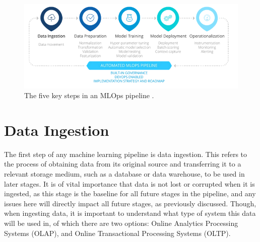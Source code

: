 \documentclass[12pt]{report}
\begin{document}





\begin{figure}[H]
    \centering
    \includegraphics[width=.75\linewidth]{MLPipeline.png}
    \caption{The five key steps in an MLOps pipeline \autocite{incycle_software_mlops_nodate}.}
    \label{fig:MLPipeline}
\end{figure}

\section{Data Ingestion}
The first step of any machine learning pipeline is data ingestion. This refers to the process of obtaining data from its original source
and transferring it to a relevant storage medium, such as a database or data warehouse, to be used in later stages. 
It is of vital importance that data is not lost or corrupted when it is ingested, as this stage is the baseline for all future stages in the pipeline, and any issues
here will directly impact all future stages, as previously discussed. Though, when ingesting data, it is important to understand what type of system this data 
will be used in, of which there are two options: Online Analytics Processing Systems (OLAP), and Online Transactional Processing Systems (OLTP).
\end{document}
